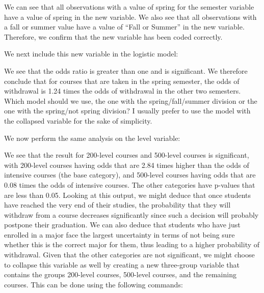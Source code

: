 \documentclass[a4paper,12pt,oneside]{book}
\begin{document}
\begin{stlog}\end{stlog}

We can see that all observations with a value of spring for the semester variable have a value of spring in the new variable. We also see that all observations with a fall or summer value have a value of 
“Fall or Summer” in the new variable. Therefore, we confirm that the new variable has been coded correctly. 

We next include this new variable in the logistic model:

\begin{stlog}\end{stlog}

We see that the odds ratio is greater than one and is significant. We therefore conclude that for courses that are taken in the spring semester, the odds of withdrawal is 1.24 times the odds 
of withdrawal in the other two semesters. Which model should we use, the one with the spring/fall/summer division or the one with the spring/not spring division? I usually prefer to use the model 
with the collapsed variable for the sake of simplicity.

We now perform the same analysis on the level variable:

\begin{stlog}\end{stlog}

We see that the result for 200-level courses and 500-level courses is significant, with 200-level courses having odds that are 2.84 times higher than the odds of intensive courses (the base category), 
and 500-level courses having odds that are 0.08 times the odds of intensive courses. The other categories have p-values that are less than 0.05. Looking at this output, we might deduce that 
once students have reached the very end of their studies, the probability that they will withdraw from a course decreases significantly since such a decision will probably postpone their graduation. 
We can also deduce that students who have just enrolled in a major face the largest uncertainty in terms of not being sure whether this is the correct major for them, thus leading to a higher probability 
of withdrawal. Given that the other categories are not significant, we might choose to collapse this variable as well by creating a new three-group variable that contains the groups 200-level courses, 
500-level courses, and the remaining courses. This can be done using the following commands:
\end{document}
